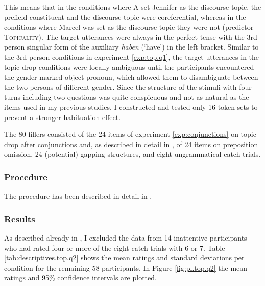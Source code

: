 This means that in the conditions where A set Jennifer as the discourse topic,  the prefield constituent and the discourse topic  were coreferential, whereas in the conditions where Marcel was set as the discourse topic  they were not (predictor \textsc{Topicality}).
The target utterances were always in the perfect tense with the 3rd person singular form of the auxiliary  \textit{haben} (`have') in the left bracket.
Similar to the 3rd person conditions in experiment \ref*{exp:top.q1}, the target utterances in the topic drop conditions were locally ambiguous  until the participants encountered the gender-marked object pronoun, which allowed them to disambiguate between the two persons of different gender.
Since the structure of the stimuli with four turns including two questions was quite conspicuous and not as natural as the items used in my previous studies, I constructed and tested only 16 token sets to prevent a stronger habituation effect.

The 80 fillers consisted of the 24 items of experiment \ref*{exp:conjunctions} on topic drop after conjunctions and, as described in detail in , of 24 items on preposition omission, 24 (potential) gapping structures, and eight ungrammatical catch trials.

\subsubsection{Procedure}
The procedure has been described in detail in .

\subsubsection{Results}
As described already in , I excluded the data from 14 inattentive participants who had rated four or more of the eight catch trials with 6 or 7.
Table \ref{tab:descriptives.top.q2} shows the mean ratings and standard deviations per condition for the remaining 58 participants.
In Figure \ref{fig:pl.top.q2} the mean ratings and 95\% confidence intervals are plotted.

